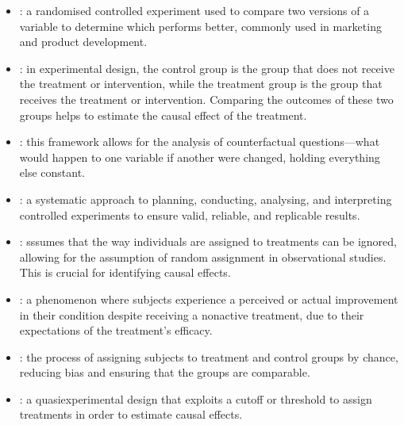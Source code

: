 \documentclass[letterpaper,10pt,english]{jupyterBook}
\begin{document}
\label{\detokenize{notebooks/glossary:experimental-design-and-analysis}}\begin{itemize}
\item {} 
\sphinxAtStartPar
{}: a randomised controlled experiment used to compare two versions of a variable to determine which performs better, commonly used in marketing and product development.

\item {} 
\sphinxAtStartPar
{}: in experimental design, the control group is the group that does not receive the treatment or intervention, while the treatment group is the group that receives the treatment or intervention. Comparing the outcomes of these two groups helps to estimate the causal effect of the treatment.

\item {} 
\sphinxAtStartPar
{}: this framework allows for the analysis of counterfactual questions—what would happen to one variable if another were changed, holding everything else constant.

\item {} 
\sphinxAtStartPar
{}: a systematic approach to planning, conducting, analysing, and interpreting controlled experiments to ensure valid, reliable, and replicable results.

\item {} 
\sphinxAtStartPar
{}: sssumes that the way individuals are assigned to treatments can be ignored, allowing for the assumption of random assignment in observational studies. This is crucial for identifying causal effects.

\item {} 
\sphinxAtStartPar
{}: a phenomenon where subjects experience a perceived or actual improvement in their condition despite receiving a non\sphinxhyphen{}active treatment, due to their expectations of the treatment’s efficacy.

\item {} 
\sphinxAtStartPar
{}: the process of assigning subjects to treatment and control groups by chance, reducing bias and ensuring that the groups are comparable.

\item {} 
\sphinxAtStartPar
{}: a quasi\sphinxhyphen{}experimental design that exploits a cutoff or threshold to assign treatments in order to estimate causal effects.


\end{itemize}
\end{document}
